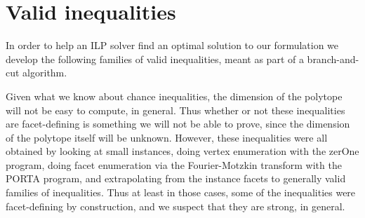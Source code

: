 \section{Valid inequalities}

In order to help an ILP solver find an optimal solution to our formulation we develop the following families of valid inequalities, meant as part of a branch-and-cut algorithm.

Given what we know about chance inequalities, the dimension of the polytope will not be easy to compute, in general. Thus whether or not these inequalities are facet-defining is something we will not be able to prove, since the dimension of the polytope itself will be unknown. However, these inequalities were all obtained by looking at small instances, doing vertex enumeration with the zerOne program\cite{Bussieck:1998:VSS:302316.302321}, doing facet enumeration via the Fourier-Motzkin transform with the PORTA program\cite{PORTA}, and extrapolating from the instance facets to generally valid families of inequalities. Thus at least in those cases, some of the inequalities were facet-defining by construction, and we suspect that they are strong, in general.

%




